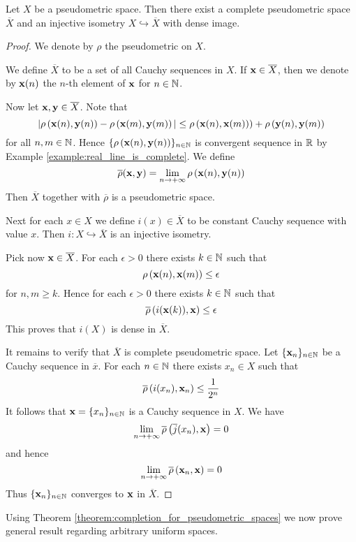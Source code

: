 \documentclass[10pt]{amsart}
\begin{document}
\begin{theorem}\label{theorem:completion_for_pseudometric_spaces}
	Let $X$ be a pseudometric space. Then there exist a complete pseudometric space $\overline{X}$ and an injective isometry $X \hookrightarrow \overline{X}$ with dense image.
\end{theorem}
\begin{proof}
	We denote by $\rho$ the pseudometric on $X$.

	We define $\overline{X}$ to be a set of all Cauchy sequences in $X$. If $\mathbf{x} \in \overline{X}$, then we denote by $\mathbf{x}(n)$ the $n$-th element of $\mathbf{x}$ for $n \in {\mathbb N}$.

	Now let $\mathbf{x}, \mathbf{y} \in \overline{X}$. Note that
	$$|\rho\left(\mathbf{x}(n),\mathbf{y}(n)\right) - \rho\left(\mathbf{x}(m),\mathbf{y}(m)\right)| \leq \rho\left(\mathbf{x}(n),\mathbf{x}(m)\right)) + \rho\left(\mathbf{y}(n),\mathbf{y}(m)\right)$$
	for all $n,m \in {\mathbb N}$. Hence $\{\rho\left(\mathbf{x}(n),\mathbf{y}(n)\right)\}_{n \in {\mathbb N}}$ is convergent sequence in ${\mathbb R}$ by Example \ref{example:real_line_is_complete}. We define
	$$\overline{\rho}(\mathbf{x},\mathbf{y}) = \lim_{n\rightarrow +\infty}\rho\left(\mathbf{x}(n),\mathbf{y}(n)\right)$$
	Then $\overline{X}$ together with $\overline{\rho}$ is a pseudometric space.

	Next for each $x \in X$ we define $i(x) \in \overline{X}$ to be constant Cauchy sequence with value $x$. Then $i:X \hookrightarrow \overline{X}$ is an injective isometry.

	Pick now $\mathbf{x} \in \overline{X}$. For each $\epsilon > 0$ there exists $k \in {\mathbb N}$ such that
	$$\rho\left(\mathbf{x}(n), \mathbf{x}(m)\right) \leq \epsilon$$
	for $n,m \geq k$. Hence for each $\epsilon > 0$ there exists $k \in {\mathbb N}$ such that
	$$\overline{\rho}\left(i(\mathbf{x}(k)), \mathbf{x}\right) \leq \epsilon$$
	This proves that $i(X)$ is dense in $\overline{X}$.

	It remains to verify that $\overline{X}$ is complete pseudometric space. Let $\{\mathbf{x}_n\}_{n \in {\mathbb N}}$ be a Cauchy sequence in $\overline{x}$. For each $n \in {\mathbb N}$ there exists $x_n \in X$ such that
	$$\overline{\rho}\left(i(x_n), \mathbf{x}_n\right) \leq \frac{1}{2^n}$$
	It follows that $\mathbf{x} = \{x_n\}_{n \in {\mathbb N}}$ is a Cauchy sequence in $X$. We have
	$$\lim_{n\rightarrow +\infty}\overline{\rho}\left(\overline{j}(x_n),\mathbf{x}\right) = 0$$
	and hence
	$$\lim_{n\rightarrow +\infty}\overline{\rho}\left(\mathbf{x}_n,\mathbf{x}\right) = 0$$
	Thus $\{\mathbf{x}_n\}_{n \in {\mathbb N}}$ converges to $\mathbf{x}$ in $\overline{X}$.
\end{proof}
\noindent
Using Theorem \ref{theorem:completion_for_pseudometric_spaces} we now prove general result regarding arbitrary uniform spaces.
\end{document}
